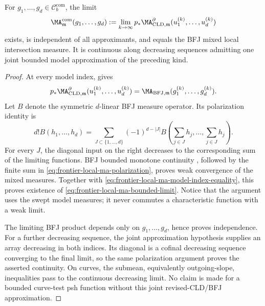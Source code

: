 \begin{proposition}\label{prop:frontier-local-ma-bounded-closure}
For \(g_1,\ldots,g_d\in\mathcal C_b^{\mathrm{com}}\), the limit
\begin{equation}
 \MA^{\mathrm{com}}_{\mathfrak m}(g_1,\ldots,g_d)
 :=\lim_{k\to\infty}
 p_*\MA^{\partial}_{\mathrm{CLD},\mathfrak m}
       (u_1^{(k)},\ldots,u_d^{(k)})
 \label{eq:frontier-local-ma-bounded-limit}
\end{equation}
exists, is independent of all approximants, and equals the BFJ mixed local
intersection measure.  It is continuous along decreasing sequences admitting
one joint bounded model approximation of the preceding kind.
\end{proposition}

\begin{proof}
At every model index,
 gives
\begin{equation}
 p_*\MA^{\partial}_{\mathrm{CLD},\mathfrak m}
       (u_1^{(k)},\ldots,u_d^{(k)})
 =\MA_{\mathrm{BFJ},\mathfrak m}
       (g_1^{(k)},\ldots,g_d^{(k)}).
 \label{eq:frontier-local-ma-model-index-equality}
\end{equation}
Let \(B\) denote the symmetric \(d\)-linear BFJ measure operator.  Its
polarization identity is
\begin{equation}
 d!B(h_1,\ldots,h_d)
 =\sum_{J\subset\{1,\ldots,d\}}(-1)^{d-|J|}
 B\!\left(\sum_{j\in J}h_j,\ldots,
          \sum_{j\in J}h_j\right).
 \label{eq:frontier-local-ma-polarization}
\end{equation}
For every \(J\), the diagonal input on the right decreases to the
corresponding sum of the limiting functions.  BFJ bounded monotone
continuity \cite[Proposition~4.8]{BFJ08}, followed by the finite sum in
\eqref{eq:frontier-local-ma-polarization}, proves weak convergence of the
mixed measures.  Together with
\eqref{eq:frontier-local-ma-model-index-equality}, this proves existence of
\eqref{eq:frontier-local-ma-bounded-limit}.  Notice that the argument uses
the swept model measures; it never commutes a characteristic function with a
weak limit.

The limiting BFJ product depends only on \(g_1,\ldots,g_d\), hence proves
independence.  For a further decreasing sequence, the joint approximation
hypothesis supplies an array decreasing in both indices.  Its diagonal is a
cofinal decreasing sequence converging to the final limit, so the same
polarization argument proves the asserted continuity.  On curves, the
submean, equivalently outgoing-slope, inequalities pass to the continuous
decreasing limit.  No claim is made for a bounded curve-test psh function
without this joint revised-CLD/BFJ approximation.
\end{proof}

